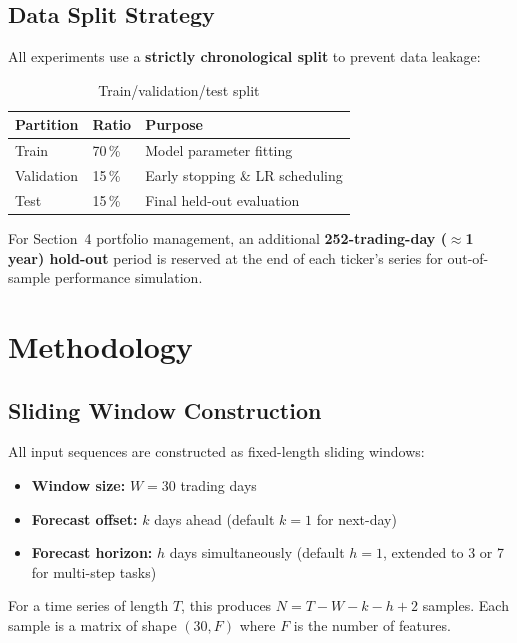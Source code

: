 \documentclass[12pt,a4paper]{article}
\begin{document}
\subsection{Data Split Strategy}

All experiments use a \textbf{strictly chronological split} to prevent data
leakage:

\begin{table}[H]
\centering
\caption{Train/validation/test split}
\begin{tabular}{lll}
\toprule
\textbf{Partition} & \textbf{Ratio} & \textbf{Purpose} \\
\midrule
Train      & 70\,\% & Model parameter fitting \\
Validation & 15\,\% & Early stopping \& LR scheduling \\
Test       & 15\,\% & Final held-out evaluation \\
\bottomrule
\end{tabular}
\end{table}

For Section~4 portfolio management, an additional \textbf{252-trading-day
($\approx$1 year) hold-out} period is reserved at the end of each ticker's series
for out-of-sample performance simulation.

\section{Methodology}

\subsection{Sliding Window Construction}

All input sequences are constructed as fixed-length sliding windows:

\begin{itemize}[leftmargin=2em]
  \item \textbf{Window size:} $W = 30$ trading days
  \item \textbf{Forecast offset:} $k$ days ahead (default $k=1$ for next-day)
  \item \textbf{Forecast horizon:} $h$ days simultaneously (default $h=1$,
        extended to 3 or 7 for multi-step tasks)
\end{itemize}

For a time series of length $T$, this produces $N = T - W - k - h + 2$ samples.
Each sample is a matrix of shape $(30, F)$ where $F$ is the number of features.
\end{document}
